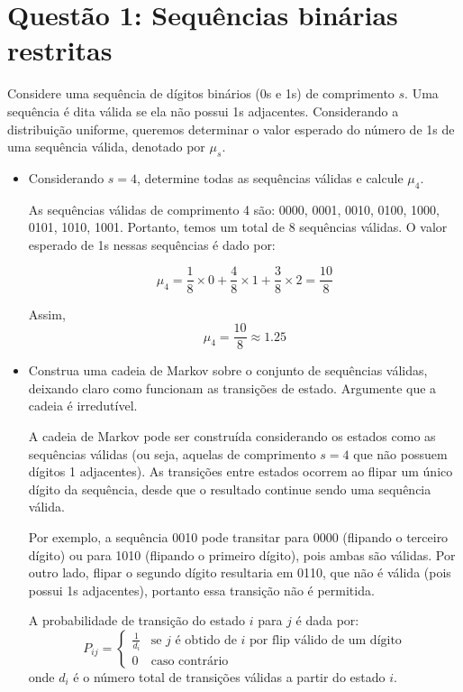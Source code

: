 \section*{Questão 1: Sequências binárias restritas}

Considere uma sequência de dígitos binários (0s e 1s) de comprimento $s$. Uma sequência é dita válida se ela não possui 1s adjacentes. Considerando a distribuição uniforme, queremos determinar o valor esperado do número de 1s de uma sequência válida, denotado por $\mu_s$.

\begin{itemize}
  \item Considerando $s = 4$, determine todas as sequências válidas e calcule $\mu_4$.
  \begin{resposta}
    As sequências válidas de comprimento 4 são: 0000, 0001, 0010, 0100, 1000, 0101, 1010, 1001. Portanto, temos um total de 8 sequências válidas. O valor esperado de 1s nessas sequências é dado por: 
    
    $$ \mu_4 = \frac{1}{8} \times 0 + \frac{4}{8} \times 1 + \frac{3}{8} \times 2 = \frac{10}{8} $$
    
    Assim, 
    $$\boxed{\mu_4 = \frac{10}{8} \approx 1.25}$$
  \end{resposta}
  \item Construa uma cadeia de Markov sobre o conjunto de sequências válidas, deixando claro como funcionam as transições de estado. Argumente que a cadeia é irredutível.
  \begin{resposta}
    A cadeia de Markov pode ser construída considerando os estados como as sequências válidas (ou seja, aquelas de comprimento $s = 4$ que não possuem dígitos 1 adjacentes). As transições entre estados ocorrem ao flipar um único dígito da sequência, desde que o resultado continue sendo uma sequência válida.

    Por exemplo, a sequência 0010 pode transitar para 0000 (flipando o terceiro dígito) ou para 1010 (flipando o primeiro dígito), pois ambas são válidas. Por outro lado, flipar o segundo dígito resultaria em 0110, que não é válida (pois possui 1s adjacentes), portanto essa transição não é permitida.

    A probabilidade de transição do estado $i$ para $j$ é dada por:
    $$ P_{ij} = \begin{cases}
      \frac{1}{d_i} & \text{se } j \text{ é obtido de } i \text{ por flip válido de um dígito} \\
      0 & \text{caso contrário}
    \end{cases} $$
    onde $d_i$ é o número total de transições válidas a partir do estado $i$.


\end{resposta}
\end{itemize}
